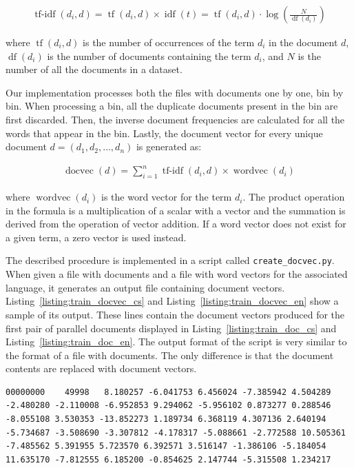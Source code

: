 \begin{align*}
\operatorname{tf-idf}(d_i, d) = \operatorname{tf}(d_i, d) \times \operatorname{idf}(t) = \operatorname{tf}(d_i, d) \cdot \log \left(\frac{N}{\operatorname{df}(d_i)} \right)
\end{align*}

where $\operatorname{tf}(d_i, d)$ is the number of occurrences of the term $d_i$ in the document $d$, $\operatorname{df}(d_i)$ is the number of documents containing the term $d_i$, and $N$ is the number of all the documents in a dataset.

Our implementation processes both the files with documents one by one, bin by bin. When processing a bin, all the duplicate documents present in the bin are first discarded. Then, the inverse document frequencies are calculated for all the words that appear in the bin. Lastly, the document vector for every unique document $d=(d_1, d_2, \ldots, d_n)$ is generated as:
	
\begin{align*}
\operatorname{docvec}(d)=\sum\limits_{i=1}^{n} \operatorname{tf-idf}(d_i, d) \times \operatorname{wordvec}(d_i)
\end{align*}
	
where $\operatorname{wordvec}(d_i)$ is the word vector for the term $d_i$. The product operation in the formula is a multiplication of a scalar with a vector and the summation is derived from the operation of vector addition. If a word vector does not exist for a given term, a zero vector is used instead.
	
The described procedure is implemented in a script called \texttt{create\_docvec.py}. When given a file with documents and a file with word vectors for the associated language, it generates an output file containing document vectors. Listing~\ref{listing:train_docvec_cs} and Listing~\ref{listing:train_docvec_en} show a sample of its output. These lines contain the document vectors produced for the first pair of parallel documents displayed in Listing~\ref{listing:train_doc_cs} and Listing~\ref{listing:train_doc_en}. The output format of the script is very similar to the format of a file with documents. The only difference is that the document contents are replaced with document vectors.

\begin{lstlisting}[float=!htb,caption={Sample from a file with Czech document vectors (training)},label={listing:train_docvec_cs},firstnumber=49999]
00000000	49998	8.180257 -6.041753 6.456024 -7.385942 4.504289 -2.480280 -2.110008 -6.952853 9.294062 -5.956102 0.873277 0.288546 -8.055108 3.530353 -13.852273 1.189734 6.368119 4.307136 2.640194 -5.734687 -3.508690 -3.307812 -4.178317 -5.088661 -2.772588 10.505361 -7.485562 5.391955 5.723570 6.392571 3.516147 -1.386106 -5.184054 11.635170 -7.812555 6.185200 -0.854625 2.147744 -5.315508 1.234217
\end{lstlisting}

